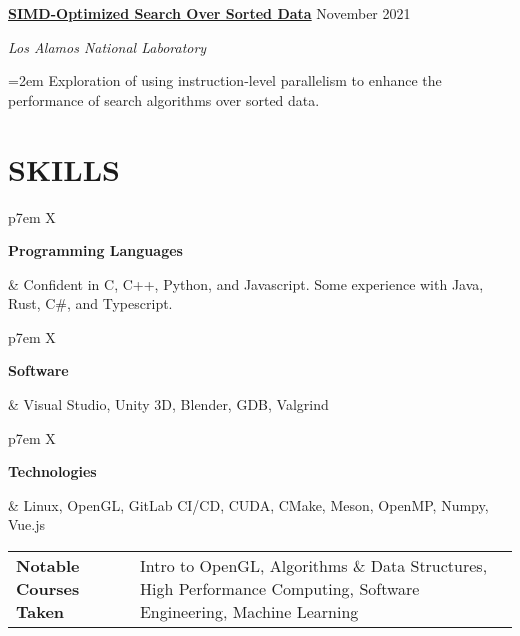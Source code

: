 \documentclass[paper=a4,fontsize=11pt]{scrartcl} %
\newlength{\spacebox}
\newcommand{\sepspace}{\vspace*{1em}}		%
\newcommand{\sym}{\raisebox{1pt}{$\blacktriangleright$}}
\newcommand{\NewPart}[1]{\section*{\sym \mbox{} \MakeUppercase{#1}}}
\newcommand{\PersonalEntry}[2]{
		\noindent\hangindent=2em\hangafter=0 %
		\parbox{\spacebox}{        %
		\textit{#1}}		       %
		\hspace{1.5em} #2 \par
		\sepspace}
\newcommand{\SkillsEntry}[2]{      %
		\noindent
		\begin{tabularx}{\linewidth}{ p{7em} X }
			\noindent
			\begin{minipage}[t]{7em}
				\textbf{#1}
			\end{minipage} &
			\noindent \normalfont \small #2
		\end{tabularx}
		\sepspace}
\newcommand{\EducationEntry}[5]{
		\Large \noindent \textbf{#1} \hfill \\   %
		\normalsize \noindent \textit{#2} \hfill	  %
		\colorbox{yel}{\color{blk}#3} \par  %
		\noindent \textit{#4} \par        %
		\noindent\hangindent=2em\hangafter=0 \small #5 %
		\normalsize \par
		\sepspace}
\newcommand{\WorkEntry}[4]{				  %
		\noindent \textbf{#1} \hfill      %
		\colorbox{yel}{\color{blk}#2} \par  %
		\noindent \textit{#3} \par              %
		\noindent\hangindent=2em\hangafter=0 \small #4 %
		\normalsize \par
		\sepspace}
\begin{document}
\WorkEntry{\href{https://asmedigitalcollection.asme.org/computingengineering/article-abstract/22/2/021009/1121736/simd-Optimized-Search-Over-Sorted-Data}{SIMD-Optimized Search Over Sorted Data}}
	{November 2021}{Los Alamos National Laboratory}
	{Exploration of using instruction-level parallelism to enhance the performance of search algorithms over sorted data.}


\NewPart{Skills}{}

\SkillsEntry{Programming Languages}{
	Confident in C, C++, Python, and Javascript.
	Some experience with Java, Rust, C\#, and Typescript.
}

\SkillsEntry{Software}{
	Visual Studio, Unity 3D, Blender, GDB, Valgrind
}

\SkillsEntry{Technologies}{
	Linux, OpenGL, GitLab CI/CD, CUDA, CMake, Meson, OpenMP, Numpy, Vue.js
}

\SkillsEntry{Notable Courses Taken}{
	Intro to OpenGL, Algorithms \& Data Structures,
	High Performance Computing, Software Engineering,
	Machine Learning
}
\end{document}
